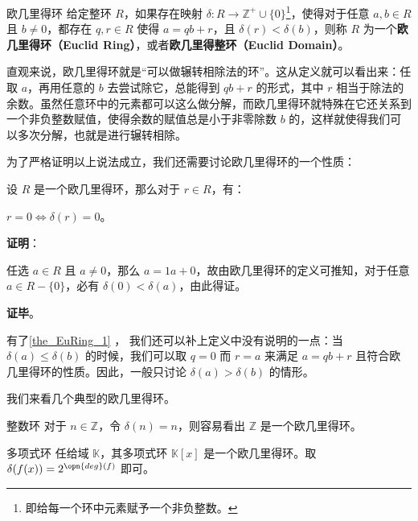 

\begin{definition}{欧几里得环}
给定整环 $R$，如果存在映射 $\delta:R\to\mathbb{Z}^+\cup\{0\}$\footnote{即给每一个环中元素赋予一个非负整数。}，使得对于任意 $a, b\in R$ 且 $b\not=0$，都存在 $q, r\in R$ 使得 $a=qb+r$，且 $\delta(r)<\delta(b)$，则称 $R$ 为一个\textbf{欧几里得环（Euclid Ring）}，或者\textbf{欧几里得整环（Euclid Domain）}。
\end{definition}



直观来说，欧几里得环就是“可以做辗转相除法的环”。这从定义就可以看出来：任取 $a$，再用任意的 $b$ 去尝试除它，总能得到 $qb+r$ 的形式，其中 $r$ 相当于除法的余数。虽然任意环中的元素都可以这么做分解，而欧几里得环就特殊在它还关系到一个非负整数赋值，使得余数的赋值总是小于非零除数 $b$ 的，这样就使得我们可以多次分解，也就是进行辗转相除。

为了严格证明以上说法成立，我们还需要讨论欧几里得环的一个性质：

\begin{theorem}{}\label{the_EuRing_1}
设 $R$ 是一个欧几里得环，那么对于 $r\in R$，有：

$r=0\iff \delta(r)=0$。
\end{theorem}

\textbf{证明}：

任选 $a\in R$ 且 $a\not=0$，那么 $a=1a+0$，故由欧几里得环的定义可推知，对于任意 $a\in R-\{0\}$，必有 $\delta(0)<\delta(a)$，由此得证。

\textbf{证毕}。

有了\autoref{the_EuRing_1} ， 我们还可以补上定义中没有说明的一点：当 $\delta(a)\leq\delta(b)$ 的时候，我们可以取 $q=0$ 而 $r=a$ 来满足 $a=qb+r$ 且符合欧几里得环的性质。因此，一般只讨论 $\delta(a)>\delta(b)$ 的情形。

我们来看几个典型的欧几里得环。

\begin{example}{整数环}
对于 $n\in\mathbb{Z}$，令 $\delta(n)=n$，则容易看出 $\mathbb{Z}$ 是一个欧几里得环。
\end{example}

\begin{example}{多项式环}
任给域 $\mathbb{K}$，其多项式环 $\mathbb{K}[x]$ 是一个欧几里得环。取 $\delta(f(x))=2^{\opn{deg}(f)}$ 即可。
\end{example}

